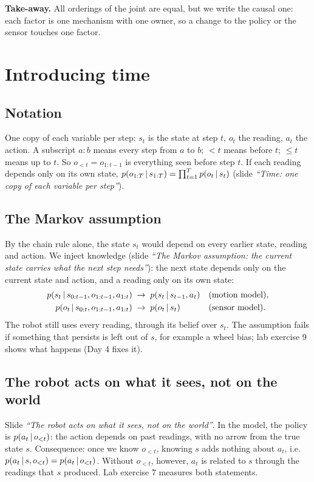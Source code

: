 \documentclass[11pt]{article}
\newcommand{\slide}[1]{\textit{``#1''}}
\begin{document}
\begin{keyidea}
\textbf{Take-away.} All orderings of the joint are equal, but we write the causal one: each factor is one mechanism with one owner, so a change to the policy or the sensor touches one factor.
\end{keyidea}

\section{Introducing time}

\subsection*{Notation}
One copy of each variable per step: $s_t$ is the state at step $t$, $o_t$ the reading, $a_t$ the action. A subscript $a{:}b$ means every step from $a$ to $b$; $<t$ means before $t$; $\le t$ means up to $t$. So $o_{<t}=o_{1:t-1}$ is everything seen before step $t$.
If each reading depends only on its own state, $p(o_{1:T}\,|\, s_{1:T})=\prod_{t=1}^{T}p(o_t\,|\, s_t)$ (slide \slide{Time: one copy of each variable per step}).

\subsection*{The Markov assumption}
By the chain rule alone, the state $s_t$ would depend on every earlier state, reading and action. We inject knowledge (slide \slide{The Markov assumption: the current state carries what the next step needs}): the next state depends only on the current state and action, and a reading only on its own state:
\[
\begin{aligned}
p(s_t\,|\, s_{0:t-1},o_{1:t-1},a_{1:t})&\;\to\;p(s_t\,|\, s_{t-1},a_t)&&\text{(motion model)},\\
p(o_t\,|\, s_{0:t},o_{1:t-1},a_{1:t})&\;\to\;p(o_t\,|\, s_t)&&\text{(sensor model)}.
\end{aligned}
\]
The robot still uses every reading, through its belief over $s_t$. The assumption fails if something that persists is left out of $s$, for example a wheel bias; lab exercise 9 shows what happens (Day 4 fixes it).

\subsection*{The robot acts on what it sees, not on the world}
Slide \slide{The robot acts on what it sees, not on the world}. In the model, the policy is $p(a_t\,|\, o_{<t})$: the action depends on past readings, with no arrow from the true state $s$.
Consequence: once we know $o_{<t}$, knowing $s$ adds nothing about $a_t$, i.e.\ $p(a_t\,|\, s,o_{<t})=p(a_t\,|\, o_{<t})$. Without $o_{<t}$, however, $a_t$ is related to $s$ through the readings that $s$ produced. Lab exercise 7 measures both statements.
\end{document}
